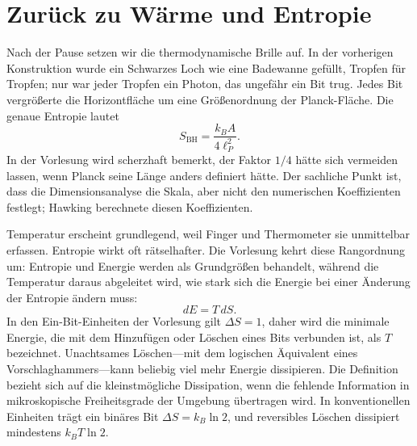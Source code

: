 \section{Zurück zu Wärme und Entropie}

Nach der Pause setzen wir die thermodynamische Brille auf. In der vorherigen Konstruktion wurde ein Schwarzes Loch wie eine Badewanne gefüllt, Tropfen für Tropfen; nur war jeder Tropfen ein Photon, das ungefähr ein Bit trug. Jedes Bit vergrößerte die Horizontfläche um eine Größenordnung der Planck-Fläche. Die genaue Entropie lautet
\begin{equation}
S_{\mathrm{BH}}=\frac{k_B A}{4\ell_P^2}.
\end{equation}
In der Vorlesung wird scherzhaft bemerkt, der Faktor \(1/4\) hätte sich vermeiden lassen, wenn Planck seine Länge anders definiert hätte. Der sachliche Punkt ist, dass die Dimensionsanalyse die Skala, aber nicht den numerischen Koeffizienten festlegt; Hawking berechnete diesen Koeffizienten.

Temperatur erscheint grundlegend, weil Finger und Thermometer sie unmittelbar erfassen. Entropie wirkt oft rätselhafter. Die Vorlesung kehrt diese Rangordnung um: Entropie und Energie werden als Grundgrößen behandelt, während die Temperatur daraus abgeleitet wird, wie stark sich die Energie bei einer Änderung der Entropie ändern muss:
\begin{equation}
dE=T\,dS.
\end{equation}
In den Ein-Bit-Einheiten der Vorlesung gilt \(\Delta S=1\), daher wird die minimale Energie, die mit dem Hinzufügen oder Löschen eines Bits verbunden ist, als \(T\) bezeichnet. Unachtsames Löschen---mit dem logischen Äquivalent eines Vorschlaghammers---kann beliebig viel mehr Energie dissipieren. Die Definition bezieht sich auf die kleinstmögliche Dissipation, wenn die fehlende Information in mikroskopische Freiheitsgrade der Umgebung übertragen wird. In konventionellen Einheiten trägt ein binäres Bit \(\Delta S=k_B\ln2\), und reversibles Löschen dissipiert mindestens \(k_BT\ln2\).

